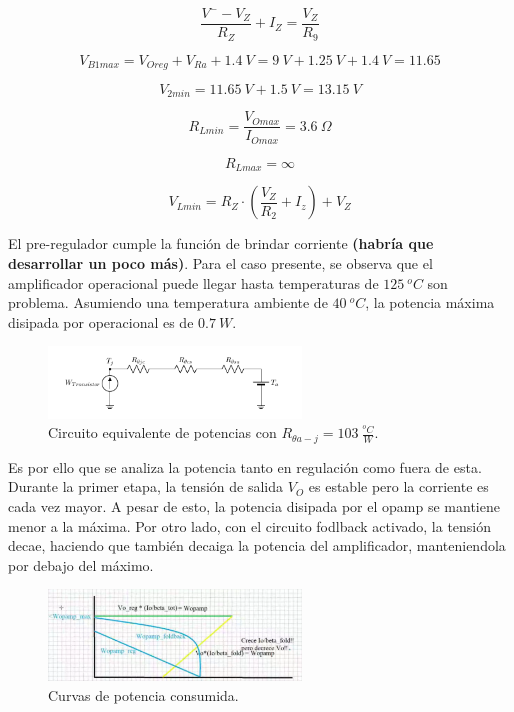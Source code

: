 \begin{equation}
\frac{V^- - V_Z}{R_Z} + I_Z = \frac{V_Z}{R_9}
\end{equation}

\begin{equation}
V_{B1max} = V_{Oreg} + V_{Ra} + 1.4 \ V = 9 \ V + 1.25 \ V + 1.4 \ V = 11.65
\end{equation}

\begin{equation}
V_{2min} = 11.65 \ V + 1.5 \ V = 13.15 \ V
\end{equation}

\begin{equation}
	R_{Lmin} = \frac{V_{Omax}}{I_{Omax}} = 3.6 \ \Omega
\end{equation}

\begin{equation}
	R_{Lmax} = \infty
\end{equation}

\begin{equation}
	V_{Lmin} = R_Z \cdot \left( \frac{V_Z}{R_2} + I_z \right) + V_Z
\end{equation}

El pre-regulador cumple la función de brindar corriente \textbf{(habría que desarrollar un poco más)}. Para el caso presente, se observa que el amplificador operacional puede llegar hasta temperaturas de $125 \ ^o C$ son problema. Asumiendo una temperatura ambiente de $40 \ ^o C$, la potencia máxima disipada por operacional es de $0.7 \ W$.
\begin{figure}[H]
\centering
	\includegraphics[width=0.6\textwidth, page=2]{ImagenesEjercicio2/Potencia.pdf}
	\caption{Circuito equivalente de potencias con $R_{\theta a-j} = 103 \ \frac{^o C}{W}$.}
	\label{fig:circuitopot}
\end{figure}

Es por ello que se analiza la potencia tanto en regulación como fuera de esta. Durante la primer etapa, la tensión de salida $V_O$ es estable pero la corriente es cada vez mayor. A pesar de esto, la potencia disipada por el opamp se mantiene menor a la máxima. Por otro lado, con el circuito fodlback activado, la tensión decae, haciendo que también decaiga la potencia del amplificador, manteniendola por debajo del máximo.
\begin{figure}[H]
\centering
	\includegraphics[width=0.6\textwidth]{ImagenesEjercicio2/Potencia2.png}
	\caption{Curvas de potencia consumida.}
	\label{fig:curvapot}
\end{figure}


